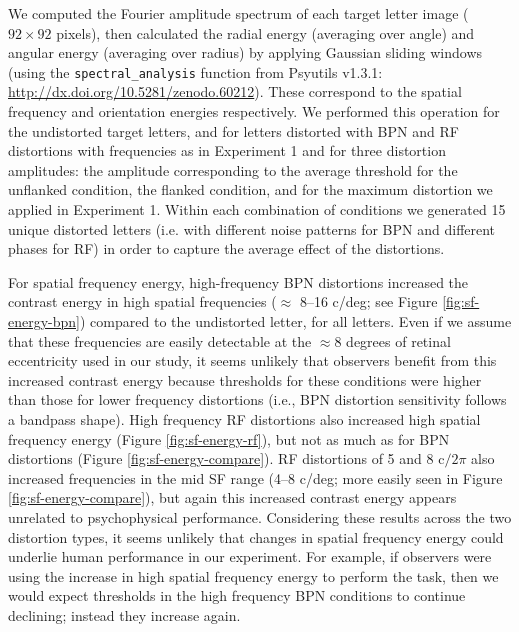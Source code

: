 \documentclass[doc, 11pt,a4paper,natbib]{apa6}\usepackage[]{graphicx}\usepackage[]{color}
\begin{document}
We computed the Fourier amplitude spectrum of each target letter image ($92 \times 92$ pixels),
then calculated the radial energy (averaging over angle) and angular energy (averaging over radius) by applying Gaussian sliding windows (using the
\texttt{spectral\_analysis}
function from Psyutils v1.3.1: \url{http://dx.doi.org/10.5281/zenodo.60212}).
These correspond to the spatial frequency and orientation energies respectively.
We performed this operation for the undistorted target letters, and for letters distorted with BPN and RF distortions with frequencies as in Experiment 1 and for three distortion amplitudes: the amplitude corresponding to the average threshold for the unflanked condition, the flanked condition, and for the maximum distortion we applied in Experiment 1.
Within each combination of conditions we generated 15 unique distorted letters (i.e. with different noise patterns for BPN and different phases for RF) in order to capture the average effect of the distortions.

For spatial frequency energy, high-frequency BPN distortions increased the contrast energy in high spatial frequencies ($\approx$ 8--16 c/deg; see Figure \ref{fig:sf-energy-bpn}) compared to the undistorted letter, for all letters.
Even if we assume that these frequencies are easily detectable at the $\approx 8$ degrees of retinal eccentricity used in our study, it seems unlikely that observers benefit from this increased contrast energy because thresholds for these conditions were higher than those for lower frequency distortions (i.e., BPN distortion sensitivity follows a bandpass shape).
High frequency RF distortions also increased high spatial frequency energy (Figure \ref{fig:sf-energy-rf}), but not as much as for BPN distortions (Figure \ref{fig:sf-energy-compare}).
RF distortions of 5 and 8 $\mathrm{c} / 2\pi$ also increased frequencies in the mid SF range (4--8 c/deg; more easily seen in Figure \ref{fig:sf-energy-compare}), but again this increased contrast energy appears unrelated to psychophysical performance.
Considering these results across the two distortion types, it seems unlikely that changes in spatial frequency energy could underlie human performance in our experiment.
For example, if observers were using the increase in high spatial frequency energy to perform the task, then we would expect thresholds in the high frequency BPN conditions to continue declining; instead they increase again.
\end{document}
